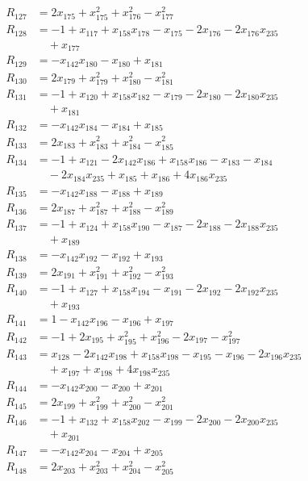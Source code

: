 \begin{align*}
R_{127}&=2x_{175}+x_{175}^{2}+x_{176}^{2}-x_{177}^{2}\\
R_{128}&=-1+x_{117}+x_{158}x_{178}-x_{175}-2x_{176}-2x_{176}x_{235}\\
&\quad{}+x_{177}\\
R_{129}&=-x_{142}x_{180}-x_{180}+x_{181}\\
R_{130}&=2x_{179}+x_{179}^{2}+x_{180}^{2}-x_{181}^{2}\\
R_{131}&=-1+x_{120}+x_{158}x_{182}-x_{179}-2x_{180}-2x_{180}x_{235}\\
&\quad{}+x_{181}\\
R_{132}&=-x_{142}x_{184}-x_{184}+x_{185}\\
R_{133}&=2x_{183}+x_{183}^{2}+x_{184}^{2}-x_{185}^{2}\\
R_{134}&=-1+x_{121}-2x_{142}x_{186}+x_{158}x_{186}-x_{183}-x_{184}\\
&\quad{}-2x_{184}x_{235}+x_{185}+x_{186}+4x_{186}x_{235}\\
R_{135}&=-x_{142}x_{188}-x_{188}+x_{189}\\
R_{136}&=2x_{187}+x_{187}^{2}+x_{188}^{2}-x_{189}^{2}\\
R_{137}&=-1+x_{124}+x_{158}x_{190}-x_{187}-2x_{188}-2x_{188}x_{235}\\
&\quad{}+x_{189}\\
R_{138}&=-x_{142}x_{192}-x_{192}+x_{193}\\
R_{139}&=2x_{191}+x_{191}^{2}+x_{192}^{2}-x_{193}^{2}\\
R_{140}&=-1+x_{127}+x_{158}x_{194}-x_{191}-2x_{192}-2x_{192}x_{235}\\
&\quad{}+x_{193}\\
R_{141}&=1-x_{142}x_{196}-x_{196}+x_{197}\\
R_{142}&=-1+2x_{195}+x_{195}^{2}+x_{196}^{2}-2x_{197}-x_{197}^{2}\\
R_{143}&=x_{128}-2x_{142}x_{198}+x_{158}x_{198}-x_{195}-x_{196}-2x_{196}x_{235}\\
&\quad{}+x_{197}+x_{198}+4x_{198}x_{235}\\
R_{144}&=-x_{142}x_{200}-x_{200}+x_{201}\\
R_{145}&=2x_{199}+x_{199}^{2}+x_{200}^{2}-x_{201}^{2}\\
R_{146}&=-1+x_{132}+x_{158}x_{202}-x_{199}-2x_{200}-2x_{200}x_{235}\\
&\quad{}+x_{201}\\
R_{147}&=-x_{142}x_{204}-x_{204}+x_{205}\\
R_{148}&=2x_{203}+x_{203}^{2}+x_{204}^{2}-x_{205}^{2}\\

\end{align*}
